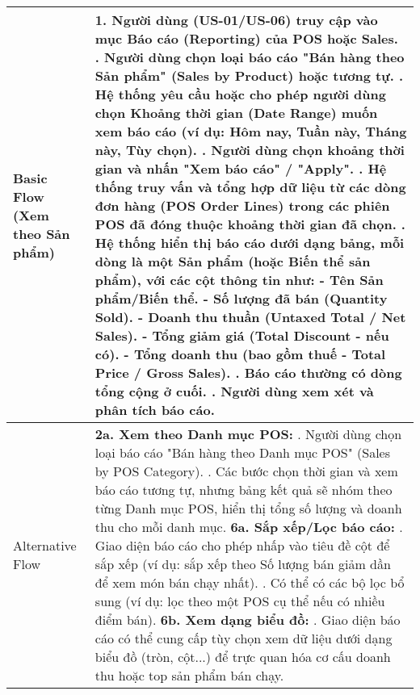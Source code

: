 \begin{longtable}{|m{4cm}|p{11cm}|}
Basic Flow (Xem theo Sản phẩm) & 1. Người dùng (US-01/US-06) truy cập vào mục Báo cáo (Reporting) của POS hoặc Sales. \newline 2. Người dùng chọn loại báo cáo "Bán hàng theo Sản phẩm" (Sales by Product) hoặc tương tự. \newline 3. Hệ thống yêu cầu hoặc cho phép người dùng chọn Khoảng thời gian (Date Range) muốn xem báo cáo (ví dụ: Hôm nay, Tuần này, Tháng này, Tùy chọn). \newline 4. Người dùng chọn khoảng thời gian và nhấn "Xem báo cáo" / "Apply". \newline 5. Hệ thống truy vấn và tổng hợp dữ liệu từ các dòng đơn hàng (POS Order Lines) trong các phiên POS đã đóng thuộc khoảng thời gian đã chọn. \newline 6. Hệ thống hiển thị báo cáo dưới dạng bảng, mỗi dòng là một Sản phẩm (hoặc Biến thể sản phẩm), với các cột thông tin như: \newline    - Tên Sản phẩm/Biến thể. \newline    - Số lượng đã bán (Quantity Sold). \newline    - Doanh thu thuần (Untaxed Total / Net Sales). \newline    - Tổng giảm giá (Total Discount - nếu có). \newline    - Tổng doanh thu (bao gồm thuế - Total Price / Gross Sales). \newline 7. Báo cáo thường có dòng tổng cộng ở cuối. \newline 8. Người dùng xem xét và phân tích báo cáo. \\
\hline
Alternative Flow & \textbf{2a. Xem theo Danh mục POS:} \newline    1. Người dùng chọn loại báo cáo "Bán hàng theo Danh mục POS" (Sales by POS Category). \newline    2. Các bước chọn thời gian và xem báo cáo tương tự, nhưng bảng kết quả sẽ nhóm theo từng Danh mục POS, hiển thị tổng số lượng và doanh thu cho mỗi danh mục. \newline \textbf{6a. Sắp xếp/Lọc báo cáo:} \newline    1. Giao diện báo cáo cho phép nhấp vào tiêu đề cột để sắp xếp (ví dụ: sắp xếp theo Số lượng bán giảm dần để xem món bán chạy nhất). \newline    2. Có thể có các bộ lọc bổ sung (ví dụ: lọc theo một POS cụ thể nếu có nhiều điểm bán). \newline \textbf{6b. Xem dạng biểu đồ:} \newline    1. Giao diện báo cáo có thể cung cấp tùy chọn xem dữ liệu dưới dạng biểu đồ (tròn, cột...) để trực quan hóa cơ cấu doanh thu hoặc top sản phẩm bán chạy. \\

\end{longtable}
